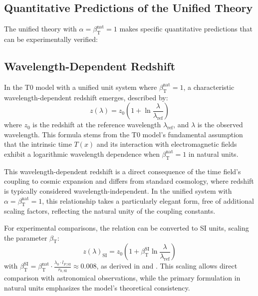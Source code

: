 \documentclass[12pt,a4paper]{article}
\newcommand{\Tfield}{T(x)}
\newcommand{\betaT}{\beta_{\text{T}}}
\begin{document}
	\subsection{Quantitative Predictions of the Unified Theory}
	
	The unified theory with \(\alpha = \betaT^{\text{nat}} = 1\) makes specific quantitative predictions that can be experimentally verified:
	
	\subsection{Wavelength-Dependent Redshift}
	
	In the T0 model with a unified unit system where \(\betaT^{\text{nat}} = 1\), a characteristic wavelength-dependent redshift emerges, described by:
	\begin{equation}
		z(\lambda) = z_0 \left(1 + \ln \frac{\lambda}{\lambda_{\text{ref}}}\right)
	\end{equation}
	where \(z_0\) is the redshift at the reference wavelength \(\lambda_{\text{ref}}\), and \(\lambda\) is the observed wavelength. This formula stems from the T0 model's fundamental assumption that the intrinsic time \(\Tfield\) and its interaction with electromagnetic fields exhibit a logarithmic wavelength dependence when \(\betaT^{\text{nat}} = 1\) in natural units.
	
	This wavelength-dependent redshift is a direct consequence of the time field's coupling to cosmic expansion and differs from standard cosmology, where redshift is typically considered wavelength-independent. In the unified system with \(\alpha = \betaT^{\text{nat}} = 1\), this relationship takes a particularly elegant form, free of additional scaling factors, reflecting the natural unity of the coupling constants.
	
	For experimental comparisons, the relation can be converted to SI units, scaling the parameter \(\betaT\):
	\begin{equation}
		z(\lambda)_{\text{SI}} = z_0 \left(1 + \betaT^{\text{SI}} \ln \frac{\lambda}{\lambda_{\text{ref}}}\right)
	\end{equation}
	with \(\betaT^{\text{SI}} = \betaT^{\text{nat}} \cdot \frac{\lambda_0 \cdot l_{P,\text{SI}}}{r_{0,\text{SI}}} \approx 0.008\), as derived in \cite{pascher_emergente_gravitation_2025} and \cite{pascher_params_2025}. This scaling allows direct comparison with astronomical observations, while the primary formulation in natural units emphasizes the model's theoretical consistency.
	
\end{document}
